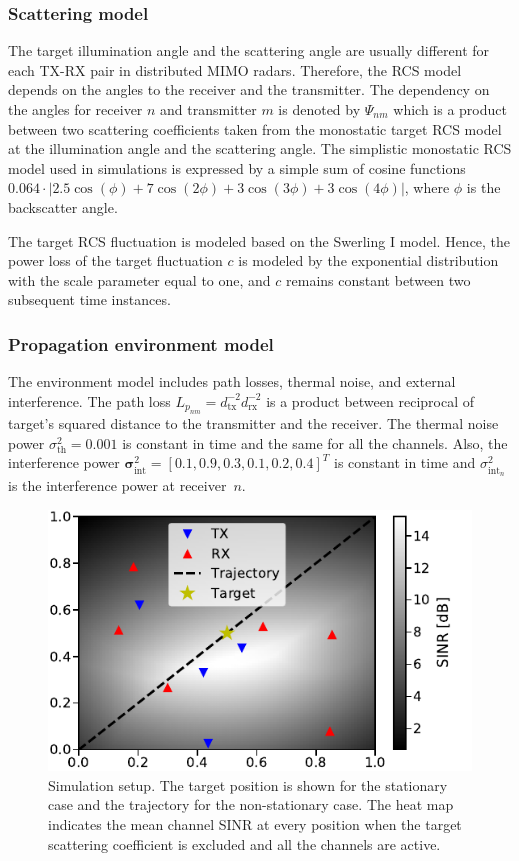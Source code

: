 \documentclass[english, 12pt, a4paper, elec, utf8, a-1b, online]{aaltothesis}
\newcommand{\abs}[1]{\lvert#1\rvert}
\newcommand{\thnoise}{\sigma^2_{\text{th}}}
\newcommand{\eintnoise}{\sigma^2_{\text{int}_{n}}}
\newcommand{\vintnoise}{\boldsymbol{\sigma}^2_{\text{int}}}
\newcommand{\epl}{L_{p_{nm}}}
\newcommand{\ercs}{\Psi_{nm}}
\begin{document}
\subsubsection{Scattering model}
\label{sec:sc_model}

The target illumination angle and the scattering angle are usually different for each TX-RX pair in distributed MIMO radars.
Therefore, the RCS model depends on the angles to the receiver and the transmitter.
The dependency on the angles for receiver $n$ and transmitter $m$ is denoted by $\ercs$ which is a product between two scattering coefficients taken from the monostatic target RCS model at the illumination angle and the scattering angle.
The simplistic monostatic RCS model used in simulations is expressed by a simple sum of cosine functions $0.064 \cdot \abs{2.5\cos(\phi) + 7\cos(2\phi) + 3\cos(3\phi) + 3\cos(4\phi)}$, where $\phi$ is the backscatter angle.

The target RCS fluctuation is modeled based on the Swerling I model.
Hence, the power loss of the target fluctuation $c$ is modeled by the exponential distribution with the scale parameter equal to one, and $c$ remains constant between two subsequent time instances.

\subsubsection{Propagation environment model}
\label{sec:env_model}

The environment model includes path losses, thermal noise, and external interference.
The path loss $\epl = d_\text{tx}^{-2} d_\text{rx}^{-2}$ is a product between
reciprocal of target's squared distance to the transmitter and the receiver.
The thermal noise power $\thnoise=0.001$ is constant in time and the same for all the channels.
Also, the interference power $\vintnoise=[0.1, 0.9, 0.3, 0.1, 0.2, 0.4]^T$ is constant in time and $\eintnoise$ is the interference power at receiver~$n$.

\begin{figure}[!tb]
    \centering
    \includegraphics[width=.6\textwidth]{figures/MAB/env.pdf}
    \caption{Simulation setup.
    The target position is shown for the stationary case and the trajectory for the non-stationary case. 
    The heat map indicates the mean channel SINR at every position when the target scattering coefficient is excluded and all the channels are active.}
    \label{fig:env}
\end{figure}
\end{document}
